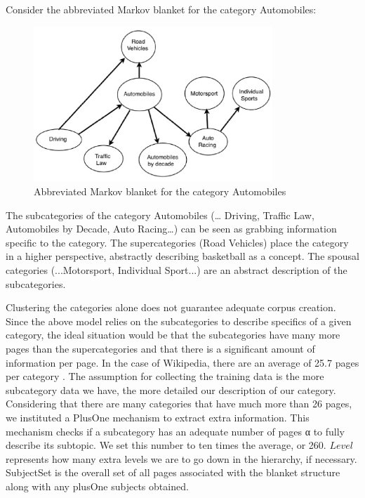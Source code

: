 Consider the abbreviated Markov blanket for the category Automobiles:  



\begin{figure}[t]
\centering
\includegraphics[width=90mm]{BlanketExample.eps}
\caption{Abbreviated Markov blanket for the category Automobiles}
\label{fig:abbrv_bb_blanket}
\end{figure}

The subcategories of the category Automobiles (… Driving, Traffic Law, Automobiles by Decade, Auto Racing…) can be seen as grabbing information specific to the category. The supercategories (Road Vehicles) place the category in a higher perspective, abstractly describing basketball as a concept. The spousal categories (...Motorsport, Individual Sport...) are an abstract description of the subcategories. 

Clustering the categories alone does not guarantee adequate corpus creation. Since the above model relies on the subcategories to describe specifics of a given category, the ideal situation would be that the subcategories have many more pages than the supercategories and that there is a significant amount of information per page. 
In the case of Wikipedia, there are an average of 25.7 pages per category \cite{1321474}. The assumption for collecting the training data is the more subcategory data we have, the more detailed our description of our category. Considering that there are many categories that have much more than 26 pages, we instituted a PlusOne mechanism to extract extra information. This mechanism checks if a subcategory has an adequate number of pages α to fully describe its subtopic. We set this number to ten times the average, or 260. $Level$ represents how many extra levels we are to go down in the hierarchy, if necessary. SubjectSet is the overall set of all pages associated with the blanket structure along with any plusOne subjects obtained. 

